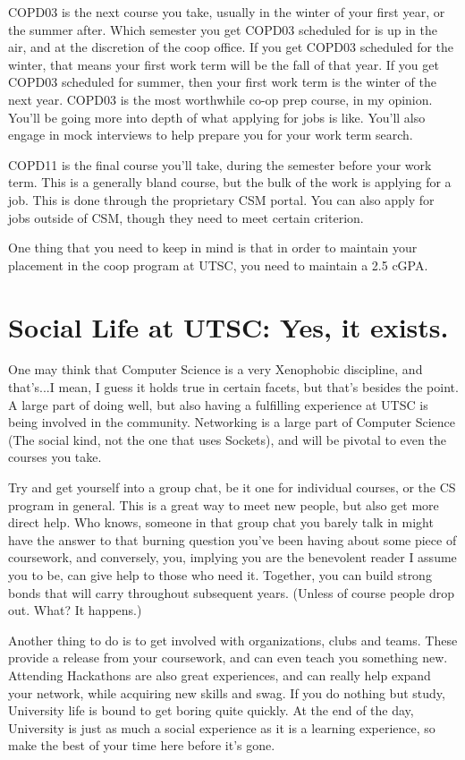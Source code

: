 \documentclass[11pt]{article}
\begin{document}
COPD03 is the next course you take, usually in the winter of your first
year, or the summer after. Which semester you get COPD03 scheduled for
is up in the air, and at the discretion of the coop office. If you get
COPD03 scheduled for the winter, that means your first work term will
be the fall of that year. If you get COPD03 scheduled for summer, then
your first work term is the winter of the next year. COPD03 is the most
worthwhile co-op prep course, in my opinion. You'll be going more into
depth of what applying for jobs is like. You'll also engage in mock
interviews to help prepare you for your work term search.

COPD11 is the final course you'll take, during the semester before your
work term. This is a generally bland course, but the bulk of the work is
applying for a job. This is done through the proprietary CSM portal. You
can also apply for jobs outside of CSM, though they need to meet certain
criterion.

One thing that you need to keep in mind is that in order to maintain
your placement in the coop program at UTSC, you need to maintain a 2.5
cGPA.

\section{Social Life at UTSC: Yes, it exists.}
One may think that Computer Science is a very Xenophobic discipline,
and that's...I mean, I guess it holds true in certain facets, but
that's besides the point. A large part of doing well, but also having
a fulfilling experience at UTSC is being involved in the community.
Networking is a large part of Computer Science (The social kind, not
the one that uses Sockets), and will be pivotal to even the courses you
take.

Try and get yourself into a group chat, be it one for individual
courses, or the CS program in general. This is a great way to meet new
people, but also get more direct help. Who knows, someone in that group
chat you barely talk in might have the answer to that burning question
you've been having about some piece of coursework, and conversely, you,
implying you are the benevolent reader I assume you to be, can give help
to those who need it. Together, you can build strong bonds that will
carry throughout subsequent years. (Unless of course people drop out.
What? It happens.)

Another thing to do is to get involved with organizations, clubs and
teams. These provide a release from your coursework, and can even teach
you something new. Attending Hackathons are also great experiences,
and can really help expand your network, while acquiring new skills
and swag. If you do nothing but study, University life is bound to get
boring quite quickly. At the end of the day, University is just as much
a social experience as it is a learning experience, so make the best of
your time here before it's gone.
\end{document}
